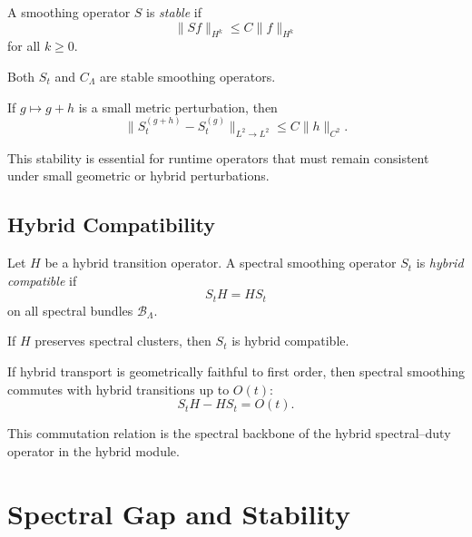\begin{definition}
A smoothing operator $S$ is \emph{stable} if
\[
\|S f\|_{H^k} \le C \|f\|_{H^k}
\]
for all $k \ge 0$.
\end{definition}

\begin{lemma}
Both $S_t$ and $C_\Lambda$ are stable smoothing operators.
\end{lemma}

\begin{theorem}
If $g \mapsto g+h$ is a small metric perturbation, then
\[
\|S_t^{(g+h)} - S_t^{(g)}\|_{L^2 \to L^2}
\le C \|h\|_{C^2}.
\]
\end{theorem}

\begin{remark}
This stability is essential for runtime operators that must remain
consistent under small geometric or hybrid perturbations.
\end{remark}

\subsection{Hybrid Compatibility}

\begin{definition}
Let $H$ be a hybrid transition operator.  
A spectral smoothing operator $S_t$ is \emph{hybrid compatible} if
\[
S_t H = H S_t
\]
on all spectral bundles $\mathcal{B}_\Lambda$.
\end{definition}

\begin{lemma}
If $H$ preserves spectral clusters, then $S_t$ is hybrid compatible.
\end{lemma}

\begin{theorem}
If hybrid transport is geometrically faithful to first order, then
spectral smoothing commutes with hybrid transitions up to $O(t)$:
\[
S_t H - H S_t = O(t).
\]
\end{theorem}

\begin{remark}
This commutation relation is the spectral backbone of the hybrid
spectral–duty operator in the hybrid module.
\end{remark}

\section{Spectral Gap and Stability}

